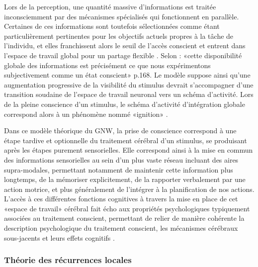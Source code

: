 Lors de la perception, une quantité massive d'informations est traitée inconsciemment par des mécanismes spécialisés qui fonctionnent en parallèle. 
Certaines de ces informations sont toutefois sélectionnées comme étant particulièrement pertinentes pour les objectifs actuels propres à la tâche de l'individu, et elles franchissent alors le seuil de l'accès conscient et entrent dans l'espace de travail global pour un partage flexible \citep{kemmerer2015we}. 
Selon \cite{dehaene2014consciousness} : «cette disponibilité globale des informations est précisément ce que nous expérimentons subjectivement comme un état conscient» p.168. 
Le modèle suppose ainsi qu'une augmentation progressive de la visibilité du stimulus devrait s'accompagner d'une transition soudaine de l'espace de travail neuronal vers un schéma d'activité. 
Lors de la pleine conscience d'un stimulus, le schéma d'activité d'intégration globale correspond alors à un phénomène nommé «ignition» \citep{dehaene2003neuronal}.

Dans ce modèle théorique du GNW, la prise de conscience correspond à une étape tardive et optionnelle du traitement cérébral d'un stimulus, se produisant après les étapes purement sensorielles.
Elle correspond ainsi à la mise en commun des informations sensorielles au sein d'un plus vaste réseau incluant des aires supra-modales, permettant notamment de maintenir cette information plus longtemps, de la mémoriser explicitement, de la rapporter verbalement par une action motrice, et plus généralement de l'intégrer à la planification de nos actions. 
L'accès à ces différentes fonctions cognitives à travers la mise en place de cet «espace de travail» cérébral fait écho aux propriétés psychologiques typiquement associées au traitement conscient, permettant de relier de manière cohérente la description psychologique du traitement conscient, les mécanismes cérébraux sous-jacents et leurs effets cognitifs \citep{khamassi2021neurosciences}. 

\subsubsection{Théorie des récurrences locales}
\label{theorierecurrencelocale}

